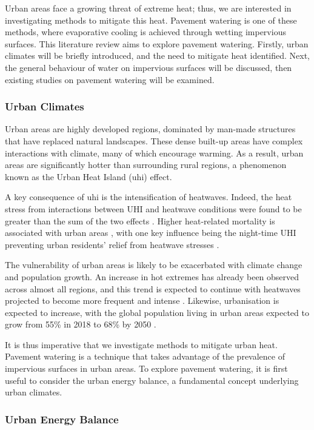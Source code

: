 \documentclass[final,3p,times,authoryear]{elsarticle}
\begin{document}
Urban areas face a growing threat of extreme heat; thus, we are interested in investigating methods to mitigate this heat. Pavement watering is one of these methods, where evaporative cooling is achieved through wetting impervious surfaces. This literature review aims to explore pavement watering. Firstly, urban climates will be briefly introduced, and the need to mitigate heat identified. Next, the general behaviour of water on impervious surfaces will be discussed, then existing studies on pavement watering will be examined.

\subsubsection{Urban Climates}\label{sec:appendix7.1.2}
Urban areas are highly developed regions, dominated by man-made structures that have
replaced natural landscapes. These dense built-up areas have complex interactions with
climate, many of which encourage warming. As a result, urban areas are significantly
hotter than surrounding rural regions, a phenomenon known as the Urban Heat Island
(\gls{uhi}) effect.

A key consequence of \gls{uhi} is the intensification of heatwaves. Indeed, the heat stress
from interactions between UHI and heatwave conditions were found to be greater than the sum of the two effects \citep{Li2013a}. Higher heat-related mortality is
associated with urban areas \citep{Heidari2020}, with one key influence being the
night-time UHI preventing urban residents' relief from heatwave stresses \citep{Clarke1972}.

The vulnerability of urban areas is likely to be exacerbated with climate change and
population growth. An increase in hot extremes has already been observed across
almost all regions, and this trend is expected to continue with heatwaves projected to
become more frequent and intense \citep{IPCC2021}. Likewise, urbanisation is expected to
increase, with the global population living in urban areas expected to grow from 55\% in
2018 to 68\% by 2050 \citep{UN2019}.

It is thus imperative that we investigate methods to mitigate urban heat. Pavement
watering is a technique that takes advantage of the prevalence of impervious surfaces in
urban areas. To explore pavement watering, it is first useful to consider the urban
energy balance, a fundamental concept underlying urban climates.

\subsubsection{Urban Energy Balance}\label{sec:appendix7.1.2.1}
\end{document}
